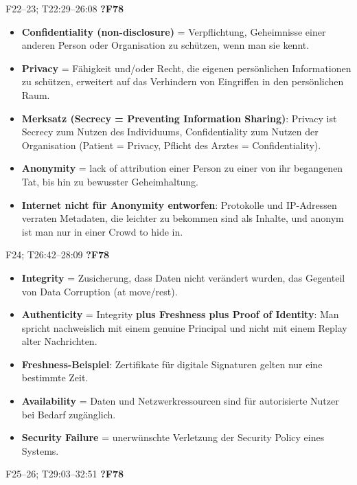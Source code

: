 \documentclass[10pt,a4paper]{article}
\newcommand{\block}[2]{\par\vspace{3pt}{\bfseries #1}\hfill{\scriptsize #2}\par\nopagebreak}
\begin{document}
\block{Confidentiality, Privacy, Anonymity}{F22--23; T22:29--26:08 \quad \textbf{?F78}}
\begin{itemize}
\item \textbf{Confidentiality (non-disclosure)} = Verpflichtung, Geheimnisse einer anderen Person oder Organisation zu schützen, wenn man sie kennt.
\item \textbf{Privacy} = Fähigkeit und/oder Recht, die eigenen persönlichen Informationen zu schützen, erweitert auf das Verhindern von Eingriffen in den persönlichen Raum.
\item \textbf{Merksatz (Secrecy = Preventing Information Sharing)}: Privacy ist Secrecy zum Nutzen des Individuums, Confidentiality zum Nutzen der Organisation (Patient = Privacy, Pflicht des Arztes = Confidentiality).
\item \textbf{Anonymity} = lack of attribution einer Person zu einer von ihr begangenen Tat, bis hin zu bewusster Geheimhaltung.
\item \textbf{Internet nicht für Anonymity entworfen}: Protokolle und IP-Adressen verraten Metadaten, die leichter zu bekommen sind als Inhalte, und anonym ist man nur in einer Crowd to hide in.
\end{itemize}
\block{Integrity, Authenticity, Availability, Security Failure}{F24; T26:42--28:09 \quad \textbf{?F78}}
\begin{itemize}
\item \textbf{Integrity} = Zusicherung, dass Daten nicht verändert wurden, das Gegenteil von Data Corruption (at move/rest).
\item \textbf{Authenticity} = Integrity \textbf{plus Freshness plus Proof of Identity}: Man spricht nachweislich mit einem genuine Principal und nicht mit einem Replay alter Nachrichten.
\item \textbf{Freshness-Beispiel}: Zertifikate für digitale Signaturen gelten nur eine bestimmte Zeit.
\item \textbf{Availability} = Daten und Netzwerkressourcen sind für autorisierte Nutzer bei Bedarf zugänglich.
\item \textbf{Security Failure} = unerwünschte Verletzung der Security Policy eines Systems.
\end{itemize}
\block{Weakness, Vulnerability, Exploit, CWE/CVE}{F25--26; T29:03--32:51 \quad \textbf{?F78}}
\end{document}
